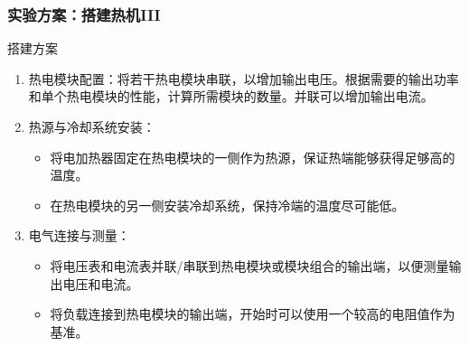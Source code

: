 \documentclass[aspectratio=169]{beamer}
\newcounter{currentenumi}
\begin{document}
	\begin{frame}	
		\frametitle{实验方案：搭建热机III}	
		
		\begin{block}{搭建方案}
			\begin{enumerate}
				\item 热电模块配置：将若干热电模块串联，以增加输出电压。根据需要的输出功率和单个热电模块的性能，计算所需模块的数量。并联可以增加输出电流。
				
				\item 热源与冷却系统安装：
				\begin{itemize}
					\item \textcolor{c4}{将电加热器固定在热电模块的一侧作为热源，保证热端能够获得足够高的温度。}
					\item \textcolor{c4}{在热电模块的另一侧安装冷却系统，保持冷端的温度尽可能低。}
				\end{itemize}				
				
				\item 电气连接与测量：
				\begin{itemize}
					\item 将电压表和电流表并联/串联到热电模块或模块组合的输出端，以便测量输出电压和电流。
					\item 将负载连接到热电模块的输出端，开始时可以使用一个较高的电阻值作为基准。
				\end{itemize}
				
				\setcounter{currentenumi}{\theenumi}			
				
			\end{enumerate}
		\end{block}
		
	\end{frame}
	
\end{document}
